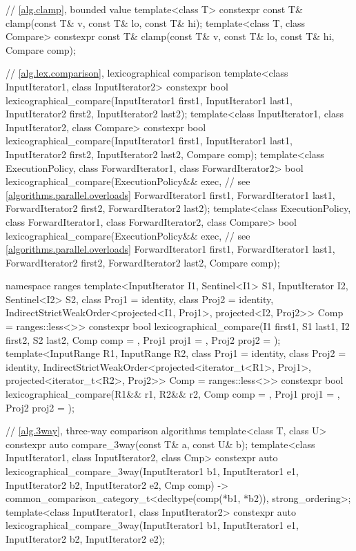 \begin{codeblock}
{  // \ref{alg.clamp}, bounded value
  template<class T>
    constexpr const T& clamp(const T& v, const T& lo, const T& hi);
  template<class T, class Compare>
    constexpr const T& clamp(const T& v, const T& lo, const T& hi, Compare comp);

  // \ref{alg.lex.comparison}, lexicographical comparison
  template<class InputIterator1, class InputIterator2>
    constexpr bool
      lexicographical_compare(InputIterator1 first1, InputIterator1 last1,
                              InputIterator2 first2, InputIterator2 last2);
  template<class InputIterator1, class InputIterator2, class Compare>
    constexpr bool
      lexicographical_compare(InputIterator1 first1, InputIterator1 last1,
                              InputIterator2 first2, InputIterator2 last2,
                              Compare comp);
  template<class ExecutionPolicy, class ForwardIterator1, class ForwardIterator2>
    bool
      lexicographical_compare(ExecutionPolicy&& exec, // see \ref{algorithms.parallel.overloads}
                              ForwardIterator1 first1, ForwardIterator1 last1,
                              ForwardIterator2 first2, ForwardIterator2 last2);
  template<class ExecutionPolicy, class ForwardIterator1, class ForwardIterator2,
           class Compare>
    bool
      lexicographical_compare(ExecutionPolicy&& exec, // see \ref{algorithms.parallel.overloads}
                              ForwardIterator1 first1, ForwardIterator1 last1,
                              ForwardIterator2 first2, ForwardIterator2 last2,
                              Compare comp);

  namespace ranges {
    template<InputIterator I1, Sentinel<I1> S1, InputIterator I2, Sentinel<I2> S2,
        class Proj1 = identity, class Proj2 = identity,
        IndirectStrictWeakOrder<projected<I1, Proj1>, projected<I2, Proj2>> Comp = ranges::less<>>
      constexpr bool
        lexicographical_compare(I1 first1, S1 last1, I2 first2, S2 last2,
                                Comp comp = {}, Proj1 proj1 = {}, Proj2 proj2 = {});
    template<InputRange R1, InputRange R2, class Proj1 = identity,
        class Proj2 = identity,
        IndirectStrictWeakOrder<projected<iterator_t<R1>, Proj1>,
          projected<iterator_t<R2>, Proj2>> Comp = ranges::less<>>
      constexpr bool
        lexicographical_compare(R1&& r1, R2&& r2, Comp comp = {},
                                Proj1 proj1 = {}, Proj2 proj2 = {});
  }

  // \ref{alg.3way}, three-way comparison algorithms
  template<class T, class U>
    constexpr auto compare_3way(const T& a, const U& b);
  template<class InputIterator1, class InputIterator2, class Cmp>
    constexpr auto
      lexicographical_compare_3way(InputIterator1 b1, InputIterator1 e1,
                                   InputIterator2 b2, InputIterator2 e2,
                                   Cmp comp)
        -> common_comparison_category_t<decltype(comp(*b1, *b2)), strong_ordering>;
  template<class InputIterator1, class InputIterator2>
    constexpr auto
      lexicographical_compare_3way(InputIterator1 b1, InputIterator1 e1,
                                   InputIterator2 b2, InputIterator2 e2);

}
\end{codeblock}
